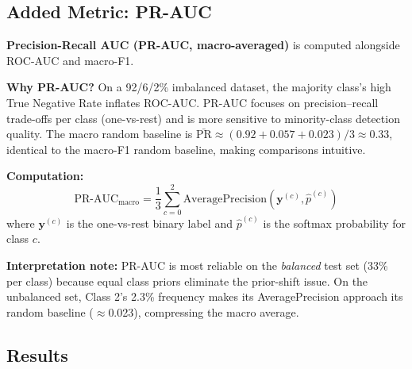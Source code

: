 \documentclass[11pt, letterpaper]{article}
\begin{document}
\subsection{Added Metric: PR-AUC}

\textbf{Precision-Recall AUC (PR-AUC, macro-averaged)} is computed alongside
ROC-AUC and macro-F1.

\textbf{Why PR-AUC?} On a 92/6/2\% imbalanced dataset, the majority class's
high True Negative Rate inflates ROC-AUC. PR-AUC focuses on precision--recall
trade-offs per class (one-vs-rest) and is more sensitive to minority-class
detection quality. The macro random baseline is
$\bar{\text{PR}}\approx(0.92+0.057+0.023)/3\approx0.33$, identical to the
macro-F1 random baseline, making comparisons intuitive.

\textbf{Computation:}
\[
  \text{PR-AUC}_\text{macro} = \frac{1}{3}\sum_{c=0}^{2}
  \text{AveragePrecision}(\mathbf{y}^{(c)}, \hat{p}^{(c)})
\]
where $\mathbf{y}^{(c)}$ is the one-vs-rest binary label and $\hat{p}^{(c)}$
is the softmax probability for class $c$.

\textbf{Interpretation note:} PR-AUC is most reliable on the \emph{balanced}
test set (33\% per class) because equal class priors eliminate the prior-shift
issue. On the unbalanced set, Class 2's 2.3\% frequency makes its
AveragePrecision approach its random baseline ($\approx$0.023), compressing
the macro average.

\subsection{Results}
\end{document}

